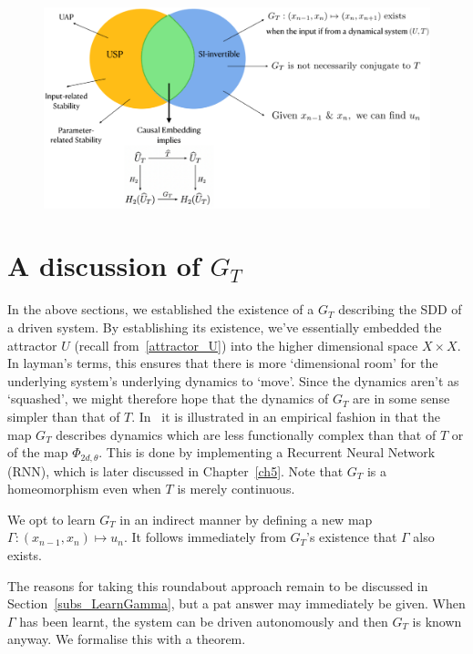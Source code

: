 \begin{figure}[ht]
  \includegraphics[width=0.7\linewidth]{Graphs/_summarypictorial.eps}
  \centering
\label{fig:pictorialSummary}
\end{figure}


\section{A discussion of $G_T$ }

In the above sections, we established the existence of a $G_T$ describing the SDD of a driven system. By establishing its existence, we’ve essentially embedded the attractor $U$ (recall from~\ref{attractor_U}) into the higher dimensional space $X\times{X}$.
In layman’s terms, this ensures that there is more `dimensional room' for the underlying system’s underlying dynamics to `move'. Since the dynamics aren’t as `squashed', we might therefore hope that the dynamics of $G_T$ are in some sense simpler than that of $T$. 
In~\cite{manjunath2021universal} it is illustrated in an empirical fashion in that the map $G_T$ describes dynamics which are less functionally complex than that of $T$ or of the map $\Phi_{2d,\theta}$. This is done by implementing a Recurrent Neural Network (RNN), which is later discussed in Chapter~\ref{ch5}.
Note that $G_T$ is a homeomorphism even when $T$ is merely continuous. 

We opt to learn $G_T$ in an indirect manner by defining a new map $\Gamma:(x_{n-1},x_n)\mapsto{u_n}$. It follows immediately from $G_T$’s existence that $\Gamma$ also exists. 

The reasons for taking this roundabout approach remain to be discussed in Section~\ref{subs_LearnGamma}, but a pat answer may immediately be given. When $\Gamma$ has been learnt, the system can be driven autonomously and then $G_T$ is known anyway. We formalise this with a theorem.

